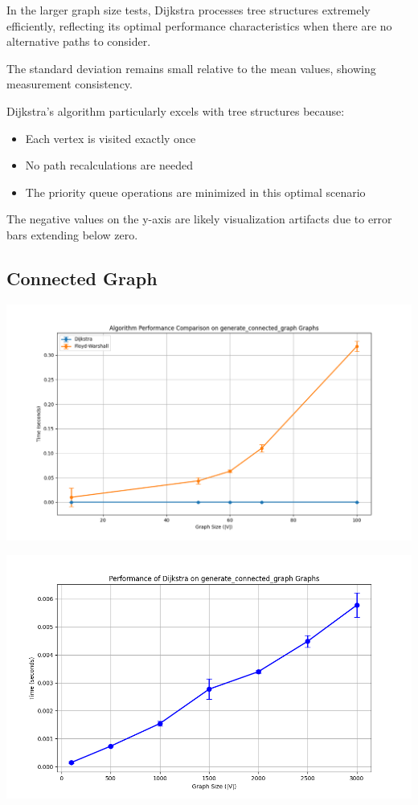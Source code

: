 \documentclass[a4paper,12pt]{article}
\begin{document}
In the larger graph size tests, Dijkstra processes tree structures extremely efficiently, reflecting its optimal performance characteristics when there are no alternative paths to consider.

The standard deviation remains small relative to the mean values, showing measurement consistency.

Dijkstra's algorithm particularly excels with tree structures because:
\begin{itemize}
\item Each vertex is visited exactly once
\item No path recalculations are needed
\item The priority queue operations are minimized in this optimal scenario
\end{itemize}

The negative values on the y-axis are likely visualization artifacts due to error bars extending below zero.
\subsection{Connected Graph}
\label{sec:org4afe544}
\begin{center}
\includegraphics[width=.9\linewidth]{dijkstra_floyd_connected.png}
\label{org3ec5383}
\end{center}
\begin{center}
\includegraphics[width=.9\linewidth]{dijkstra_connected.png}
\label{orgd789e48}
\end{center}
\end{document}
